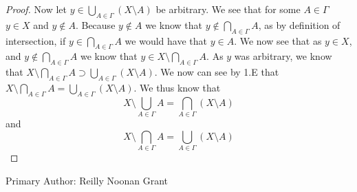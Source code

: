 \begin{proof}
Now let $y \in \bigcup_{A\in\Gamma} (X\setminus A)$ be arbitrary. We
see that for some $A \in\Gamma$ $y \in X$ and $y\notin A$. Because
$y\notin A$ we know that $y\notin \bigcap_{A\in\Gamma} A$, as by
definition of intersection, if  $y\in \bigcap_{A\in\Gamma} A$ we would
have that $y\in A$. We now see that as $y\in X$, and $y \notin
\bigcap_{A\in\Gamma} A$ we know that $y \in X \setminus \bigcap_{A \in
  \Gamma} A$. As $y$ was arbitrary, we know that  
$X \setminus \bigcap_{A \in \Gamma} A \supset \bigcup_{A\in\Gamma} 
(X\setminus A)$. We now can see by 1.E that  
$X \setminus \bigcap_{A \in \Gamma} A = \bigcup_{A\in\Gamma}
(X\setminus A)$.
We thus know that 
$$X \setminus \bigcup_{A \in \Gamma} A = \bigcap_{A\in\Gamma} (X \setminus A) $$
and
$$X \setminus \bigcap_{A \in \Gamma} A = \bigcup_{A\in\Gamma} (X \setminus A) $$
\end{proof}

Primary Author: Reilly Noonan Grant

